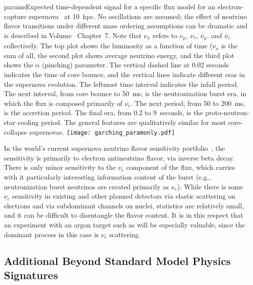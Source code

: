 \begin{dunefigure}{params}{Expected
  time-dependent signal for a specific flux model for an
  electron-capture supernova~\cite{Huedepohl:2009wh} at 10~kpc.  No oscillations are assumed; the effect of neutrino flavor transitions under different mass ordering assumptions can be dramatic and is described in Volume~\volnumberphysics{} Chapter~7. 
  Note that $\nu_x$  refers to $\nu_\mu$,
$\nu_\tau$, $\bar{\nu}_\mu$, and $\bar{\nu}_{\tau}$ collectively. The
  top plot shows the luminosity as a function of time ($\nu_x$ is the sum of all, the second plot
  shows average neutrino energy, and the third plot shows the $\alpha$
  (pinching) parameter.  The vertical dashed line at 0.02 seconds indicates
  the time of core bounce, and the vertical lines indicate different
  eras in the supernova evolution.  The leftmost time interval
  indicates the infall period.  The next interval, from core bounce to
  50~ms, is the neutronization burst era, in which the flux is
  composed primarily of $\nu_e$.  The next period, from 50 to 200~ms,
  is the accretion period. The final era, from 0.2 to 9~seconds, is
  the proto-neutron-star cooling period.  The general features are
  qualitatively similar for most core-collapse supernovae.}
\texttt{[image: garching\_paramonly.pdf]}
\end{dunefigure}

In the world's current supernova neutrino flavor sensitivity
portfolio~\cite{Scholberg:2012id, Mirizzi:2015eza}, the sensitivity 
is primarily to electron antineutrino flavor, via inverse beta decay.  
There is only minor sensitivity to the $\nu_e$
component of the flux, which carries with it particularly interesting 
information content of the burst (e.g., neutronization burst neutrinos
are created primarily as $\nu_e$).  While there is some $\nu_e$
sensitivity in existing and other planned detectors via elastic 
scattering on electrons and via subdominant channels on nuclei, 
statistics are relatively small,
and it can be difficult to disentangle the flavor content.  It is 
in this respect that an experiment with an argon target such as  
will be especially valuable, since the dominant process in 
this case is $\nu_e$  scattering.


\subsection{Additional Beyond Standard Model Physics Signatures}

